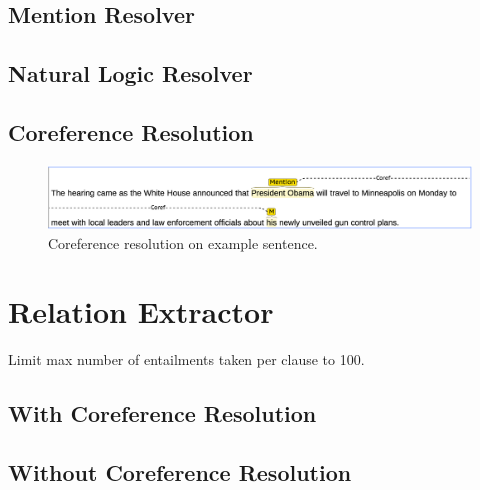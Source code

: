 \citet{chen2014nndep}
\subsection{Mention Resolver}

\subsection{Natural Logic Resolver}
\subsection{Coreference Resolution}

\begin{figure}
\includegraphics[scale=0.33]{figures/coref.png}
\caption{
\label{fig:coref}
Coreference resolution on example sentence.
}
\end{figure}

\citet{clark2015coref}

\section{Relation Extractor}
Limit max number of entailments taken per clause to 100.
\citet{angeli2015openie}
\citet{fader11reverb}

\subsection{With Coreference Resolution}

\subsection{Without Coreference Resolution}
